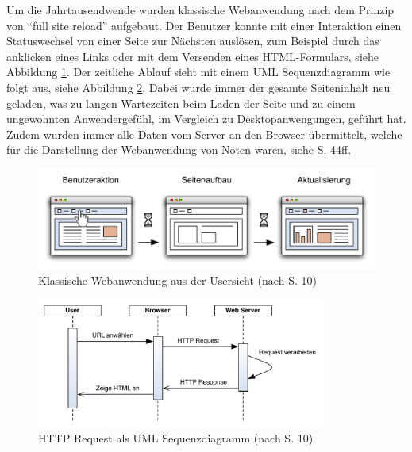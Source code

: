   Um die Jahrtausendwende wurden klassische Webanwendung nach dem Prinzip von
  ``full site reload'' aufgebaut. Der Benutzer konnte mit einer Interaktion
  einen Statuswechsel von einer Seite zur Nächsten auslösen, zum Beispiel durch
  das anklicken eines Links oder mit dem Versenden eines HTML-Formulars, siehe
  Abbildung \ref{img:classicPageReload}. Der zeitliche Ablauf sieht mit einem
  \ac{UML} Sequenzdiagramm wie folgt aus, siehe Abbildung
  \ref{img:sequenzdiagrammClassicPageReload}. Dabei wurde immer der gesamte
  Seiteninhalt neu geladen, was zu langen Wartezeiten beim Laden der Seite und
  zu einem ungewohnten Anwendergefühl, im Vergleich zu Desktopanwengungen,
  geführt hat. Zudem wurden immer alle Daten vom Server an den Browser
  übermittelt, welche für die Darstellung der Webanwendung von Nöten waren,
  siehe \cite{AjaxInAction} S. 44ff.
  \newline
  
  \begin{figure}[hbt]
    \begin{center}
      \includegraphics[width=\textwidth]{./image/classicPageReload.pdf}
      \caption{Klassische Webanwendung aus der Usersicht (nach
      \cite{DiplomarbeitStephanSchuster} S. 10)}
      \label{img:classicPageReload}
    \end{center}
  \end{figure}
  
  \begin{figure}[hbt]
    \begin{center}
      \includegraphics[width=0.85\textwidth]{./image/sequenzdiagrammClassicPageReload.pdf}
      \caption{HTTP Request als \ac{UML} Sequenzdiagramm (nach
      \cite{HttpBasics} S. 10)}
      \label{img:sequenzdiagrammClassicPageReload}
    \end{center}
  \end{figure}
  
